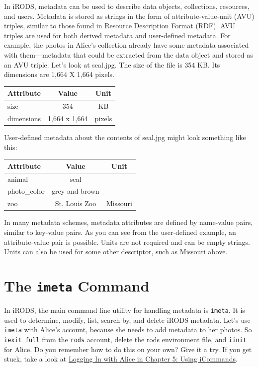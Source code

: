 \documentclass[10pt,oneside]{memoir}
\begin{document}
In iRODS, metadata can be used to describe data objects, collections, resources, and users. Metadata is stored as strings in the form of attribute-value-unit (AVU) triples, similar to those found in Resource Description Format (RDF). AVU triples are used for both derived metadata and user-defined metadata. For example, the photos in Alice's collection already have some metadata associated with them---metadata that could be extracted from the data object and stored as an AVU triple. Let's look at seal.jpg. The size of the file is 354 KB. Its dimensions are 1,664 X 1,664 pixels.

\begin{center}
\begin{tabular}{ |l|c|c| }
 \hline
Attribute & Value & Unit \\
\hline
size & 354 & KB \\
dimensions & 1,664 x 1,664 & pixels \\
 \hline
\end{tabular}
\end{center}

User-defined metadata about the contents of seal.jpg might look something like this:

\begin{center}
\begin{tabular}{ |l|c|c| }
 \hline
Attribute & Value & Unit \\
\hline
animal & seal & \\
photo\_color & grey and brown & \\
zoo & St. Louis Zoo & Missouri \\
 \hline
\end{tabular}
\end{center}

In many metadata schemes, metadata attributes are defined by name-value pairs, similar to key-value pairs. As you can see from the user-defined example, an attribute-value pair is possible. Units are not required and can be empty strings. Units can also be used for some other descriptor, such as Missouri above.

\section{The \texttt{imeta} Command}
In iRODS, the main command line utility for handling metadata is \texttt{imeta}. It is used to determine, modify, list, search by, and delete iRODS metadata. Let's use \texttt{imeta} with Alice's account, because she needs to add metadata to her photos. So \texttt{iexit full} from the \texttt{rods} account, delete the rods environment file, and \texttt{iinit} for Alice. Do you remember how to do this on your own? Give it a try. If you get stuck, take a look at \hyperref[sec:logging_in_with_alice]{Logging In with Alice in Chapter 5: Using iCommands}.
\end{document}
